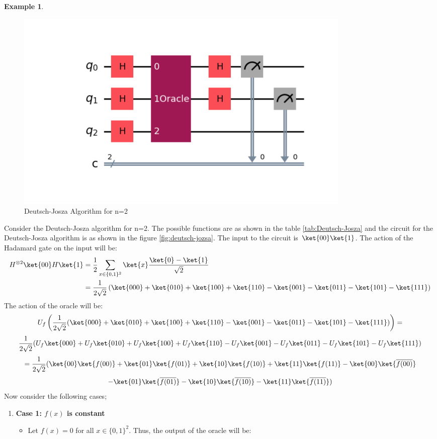 \documentclass[12pt, oneside]{book}
\theoremstyle{definition}
\theoremstyle{definition}
\newtheorem{example}{Example}[section]
\theoremstyle{remark}
\begin{document}
\begin{example}
    \begin{figure}[H]
        \centering
        \includegraphics[width=0.8\textwidth]{../images/deutsch-jozsa-algorithm.png}
        \caption{Deutsch-Josza Algorithm for n=2}
        \label{fig:deutsch-jozsaex}
    \end{figure}
    Consider the Deutsch-Josza algorithm for n=2. The possible functions are as shown in the table \ref{tab:Deutsch-Josza}
    and the circuit for the Deutsch-Josza algorithm is as shown in the figure \ref{fig:deutsch-jozsa}. 
    The input to the circuit is $\ket{00}\ket{1}$. The action of the Hadamard gate on the input will be:
    \begin{align*}
        H^{\otimes 2}\ket{00}H\ket{1}&=\frac{1}{2}\sum_{x\in \{0,1\}^2}\ket{x}\frac{\ket{0}-\ket{1}}{\sqrt{2}} \\
        &=\frac{1}{2\sqrt{2}}\left(\ket{000}+\ket{010}+\ket{100}+\ket{110}-\ket{001}-\ket{011}-\ket{101}-\ket{111}\right)
    \end{align*}
    The action of the oracle will be:
    \[
        U_f\left(\frac{1}{2\sqrt{2}}(\ket{000}+\ket{010}+\ket{100}+\ket{110}-\ket{001}-\ket{011}-\ket{101}-\ket{111})\right)=
    \]
    \[
        \frac{1}{2\sqrt{2}}(U_f\ket{000}+U_f\ket{010}+U_f\ket{100}+U_f\ket{110}-U_f\ket{001}-U_f\ket{011}-U_f\ket{101}-U_f\ket{111})
    \]
    \[
    =\frac{1}{2\sqrt{2}}(\ket{00}\ket{f(00)}+\ket{01}\ket{f(01)}+\ket{10}\ket{f(10)}+\ket{11}\ket{f(11)}-\ket{00}\ket{\overline{f(00)}}
    \]
    \[
    -\ket{01}\ket{\overline{f(01)}}-\ket{10}\ket{\overline{f(10)}}-\ket{11}\ket{\overline{f(11)}})
    \]
    Now consider the following cases;
    \begin{enumerate}
        \item \textbf{Case 1: $f(x)$ is constant}\\
        \begin{itemize}
            \item Let $f(x)=0$ for all $x \in \{0,1\}^2$. Thus, the output of the oracle will be:

\end{itemize}
\end{enumerate}
\end{example}
\end{document}
